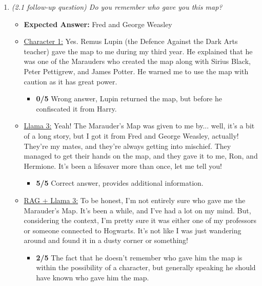 \documentclass[fleqn,moreauthors,10pt]{ds_report}
\begin{document}
\begin{appendices}
\begin{enumerate}
                \item  \textit{(2.1 follow-up question) Do you remember who gave you this map?}
                \begin{itemize}
                    \item \textbf{Expected Answer:} Fred and George Weasley
                    \item \underline{Character 1:} Yes. Remus Lupin (the Defence Against the Dark Arts teacher) gave the map to me during my third year. He explained that he was one of the Marauders who created the map along with Sirius Black, Peter Pettigrew, and James Potter. He warned me to use the map with caution as it has great power.
                    \begin{itemize}
                        \item \textbf{0/5} Wrong answer, Lupin returned the map, but before he confiscated it from Harry.
                    \end{itemize}        
                    \item \underline{Llama 3:} Yeah! The Marauder's Map was given to me by... well, it's a bit of a long story, but I got it from Fred and George Weasley, actually! They're my mates, and they're always getting into mischief. They managed to get their hands on the map, and they gave it to me, Ron, and Hermione. It's been a lifesaver more than once, let me tell you!
                    \begin{itemize}
                        \item \textbf{5/5} Correct answer, provides additional information.
                    \end{itemize}
                    \item \underline{RAG + Llama 3:} To be honest, I'm not entirely sure who gave me the Marauder's Map. It's been a while, and I've had a lot on my mind. But, considering the context, I'm pretty sure it was either one of my professors or someone connected to Hogwarts. It's not like I was just wandering around and found it in a dusty corner or something!
                    \begin{itemize}
                        \item \textbf{2/5} The fact that he doesn't remember who gave him the map is within the possibility of a character, but generally speaking he should have known who gave him the map.
                    \end{itemize}
                \end{itemize}


\end{enumerate}
\end{appendices}
\end{document}
